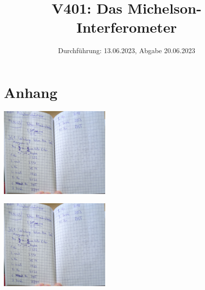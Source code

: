 
\DeclareSIUnit{}


\title{V401: Das Michelson-Interferometer}
\date{Durchführung: 13.06.2023, Abgabe 20.06.2023}


\maketitle
\thispagestyle{empty} 
\tableofcontents
\newpage
\setcounter{page}{1}






\printbibliography
\newpage

\section*{Anhang}

\begin{minipage}[t]{0.4\textwidth}
   \includegraphics[height=4.5cm, page=1]{Abbildungen/v401_messdaten.pdf}
\end{minipage}
\begin{minipage}[t]{0.4\textwidth}
   \includegraphics[height=4.5cm, keepaspectratio, page=2]{Abbildungen/v401_messdaten.pdf}
\end{minipage}

